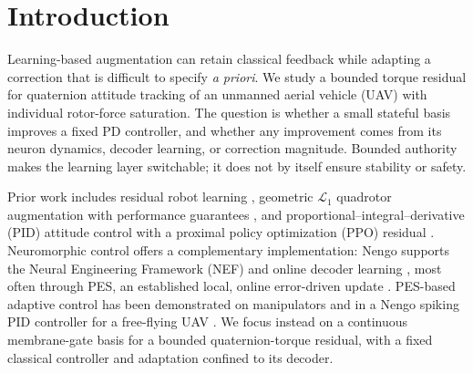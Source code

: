 \documentclass[letterpaper, 10 pt, conference]{ieeeconf}
\begin{document}
\begin{abstract}
Online neuromorphic residual control can augment a classical attitude controller without changing its feedback gains or actuator interface. Six continuous coupled membrane-gate (CMG) units and eighteen decoder weights adapted by prescribed error sensitivity (PES) add a bounded correction to the saturated quaternion proportional-derivative (PD) torque request before rotor-force allocation. Across ten matched 45-s MuJoCo cases on the Skydio X2 and a Crazyflie~2 derived model, mean quaternion-angle error falls by 17.3--60.6\% (53--57\% on the Full3 and Hard45 multi-axis missions). The same units with a fixed decoder give at most 10.3\%; their internal signals attribute the gain to decoder adaptation rather than to the neuron dynamics alone. Against LIF, ALIF, Izhikevich, and LIFRate bases, CMG--PES attains better tracking at substantially lower realized residual effort. The reductions persist under synthetic measurement noise, and learned corrections are reused across repeated disturbances. PD remains a nominal, interpretable reference; the residual adds bounded, revocable adaptation.
\end{abstract}

\section{Introduction}

Learning-based augmentation can retain classical feedback while adapting a correction that is difficult to specify \emph{a priori}. We study a bounded torque residual for quaternion attitude tracking of an unmanned aerial vehicle (UAV) with individual rotor-force saturation. The question is whether a small stateful basis improves a fixed PD controller, and whether any improvement comes from its neuron dynamics, decoder learning, or correction magnitude. Bounded authority makes the learning layer switchable; it does not by itself ensure stability or safety.

Prior work includes residual robot learning \cite{johannink2019}, geometric $\mathcal L_1$ quadrotor augmentation with performance guarantees \cite{wu2025l1quad}, and proportional--integral--derivative (PID) attitude control with a proximal policy optimization (PPO) residual \cite{li2027hpappo}. Neuromorphic control offers a complementary implementation: Nengo supports the Neural Engineering Framework (NEF) and online decoder learning \cite{bekolay2014nengo}, most often through PES, an established local, online error-driven update \cite{voelker2015pes}. PES-based adaptive control has been demonstrated on manipulators \cite{dewolf2016arm,dewolf2020nengo} and in a Nengo spiking PID controller for a free-flying UAV \cite{olivares2026selftuning}. We focus instead on a continuous membrane-gate basis for a bounded quaternion-torque residual, with a fixed classical controller and adaptation confined to its decoder.
\end{document}
